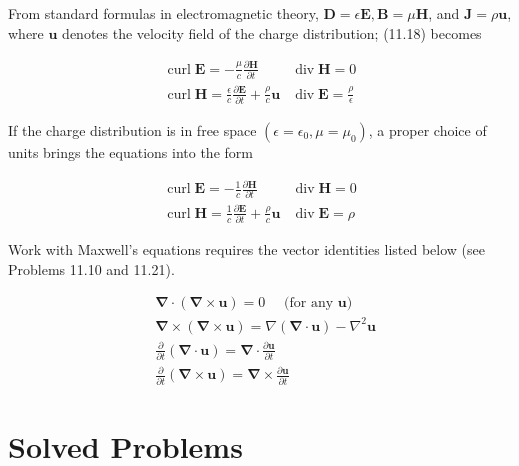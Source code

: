 \documentclass[10pt]{article}
\begin{document}
From standard formulas in electromagnetic theory, $\mathbf{D}=\epsilon \mathbf{E}, \mathbf{B}=\mu \mathbf{H}$, and $\mathbf{J}=\rho \mathbf{u}$, where $\mathbf{u}$ denotes the velocity field of the charge distribution; (11.18) becomes

$$
\begin{array}{ll}
\operatorname{curl} \mathbf{E}=-\frac{\mu}{c} \frac{\partial \mathbf{H}}{\partial t} & \operatorname{div} \mathbf{H}=0 \\
\operatorname{curl} \mathbf{H}=\frac{\epsilon}{c} \frac{\partial \mathbf{E}}{\partial t}+\frac{\rho}{c} \mathbf{u} & \operatorname{div} \mathbf{E}=\frac{\rho}{\epsilon}
\end{array}
$$

If the charge distribution is in free space $\left(\epsilon=\epsilon_{0}, \mu=\mu_{0}\right)$, a proper choice of units brings the equations into the form

\[
\begin{array}{ll}
\operatorname{curl} \mathbf{E}=-\frac{1}{c} \frac{\partial \mathbf{H}}{\partial t} & \operatorname{div} \mathbf{H}=0  \tag{11.19}\\
\operatorname{curl} \mathbf{H}=\frac{1}{c} \frac{\partial \mathbf{E}}{\partial t}+\frac{\rho}{c} \mathbf{u} & \operatorname{div} \mathbf{E}=\rho
\end{array}
\]

Work with Maxwell's equations requires the vector identities listed below (see Problems 11.10 and 11.21).


\begin{align*}
& \boldsymbol{\nabla} \cdot(\boldsymbol{\nabla} \times \mathbf{u})=0 \quad \text { (for any } \mathbf{u})  \tag{11.20}\\
& \boldsymbol{\nabla} \times(\boldsymbol{\nabla} \times \mathbf{u})=\nabla(\boldsymbol{\nabla} \cdot \mathbf{u})-\nabla^{2} \mathbf{u}  \tag{11.21}\\
& \frac{\partial}{\partial t}(\boldsymbol{\nabla} \cdot \mathbf{u})=\boldsymbol{\nabla} \cdot \frac{\partial \mathbf{u}}{\partial t}  \tag{11.22}\\
& \frac{\partial}{\partial t}(\boldsymbol{\nabla} \times \mathbf{u})=\boldsymbol{\nabla} \times \frac{\partial \mathbf{u}}{\partial t} \tag{11.23}
\end{align*}


\section*{Solved Problems}
\end{document}
